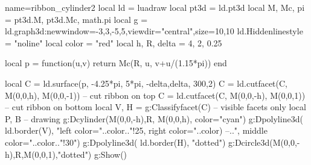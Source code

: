 \documentclass[12pt]{standalone}
\begin{document}
\begin{luadraw}{name=ribbon_cylinder2}
local ld = luadraw
local pt3d = ld.pt3d
local M, Mc, pi = pt3d.M, pt3d.Mc, math.pi
local g = ld.graph3d:new{window={-3,3,-5,5},viewdir="central",size={10,10}}
ld.Hiddenlinestyle = "noline"
local color = "red"
local h, R, delta = 4, 2, 0.25

local p = function(u,v)
    return Mc(R, u, v+u/(1.15*pi))
end

local C = ld.surface(p, -4.25*pi, 5*pi, -delta,delta, {300,2})
C = ld.cutfacet(C, {M(0,0,h), M(0,0,-1)}) -- cut ribbon on top
C = ld.cutfacet(C, {M(0,0,-h), M(0,0,1)}) -- cut ribbon on bottom
local V, H = g:Classifyfacet(C) -- visible facets only
local P, B
-- drawing
g:Dcylinder(M(0,0,-h),R, M(0,0,h), {color="cyan"})
g:Dpolyline3d( ld.border(V),
        "left color="..color.."!25, right color="..color) --..", middle color="..color.."!30")
g:Dpolyline3d( ld.border(H), "dotted")
g:Dcircle3d(M(0,0,-h),R,M(0,0,1),"dotted")
g:Show()
\end{luadraw}
\end{document}
